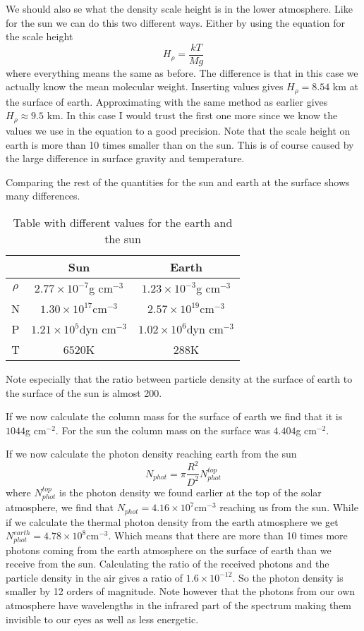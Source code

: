 \documentclass{aa}   %
\begin{document}
We should also se what the density scale height is in the lower atmosphere. Like for the sun we can do this two different ways. Either by using the equation for the scale height
\begin{equation}
 H_\rho = \frac{kT}{Mg}
\end{equation}
where everything means the same as before. The difference is that in this case we actually know the mean molecular weight. Inserting values gives $H_\rho = 8.54$ km at the surface of earth. Approximating with the same method as earlier gives $H_\rho \approx 9.5$ km. In this case I would trust the first one more since we know the values we use in the equation to a good precision. Note that the scale height on earth is more than 10 times smaller than on the sun. This is of course caused by the large difference in surface gravity and temperature.

Comparing the rest of the quantities for the sun and earth at the surface shows many differences.
\begin{table}
\begin{tabular}{|c|c|c|}
\hline
&Sun & Earth\\
\hline
$\rho$ &$2.77\times 10^{-7}$g cm$^{-3}$ &$1.23\times 10^{-3}$g cm$^{-3}$\\
\hline
N &$1.30\times10^{17}$cm$^{-3}$ &$2.57\times10^{19}$cm$^{-3}$ \\
\hline
P &$1.21\times10^{5}$dyn cm$^{-3}$ &$1.02\times10^{6}$dyn cm$^{-3}$ \\
\hline
T &$6520$K &$288$K\\
\hline
\end{tabular}
\caption{Table with different values for the earth and the sun}
\end{table}
Note especially that the ratio between particle density at the surface of earth to the surface of the sun is almost 200.

If we now calculate the column mass for the surface of earth we find that it is $1044$g cm$^{-2}$. For the sun the column mass on the surface was $4.404$g cm$^{-2}$.

If we now calculate the photon density reaching earth from the sun
\begin{equation}
 N_{phot} = \pi \frac{R^2}{D^2}N_{phot}^{top}
\end{equation}
where $N_{phot}^{top}$ is the photon density we found earlier at the top of the solar atmosphere, we find that $N_{phot} = 4.16\times10^{7}$cm$^{-3}$ reaching us from the sun.
While if we calculate the thermal photon density from the earth atmosphere we get $N_{phot}^{earth} = 4.78\times 10^8$cm$^{-3}$. Which means that there are more than 10 times more photons coming from the earth atmosphere on the surface of earth than we receive from the sun. Calculating the ratio of the received photons and the particle density in the air gives a ratio of $1.6\times 10^{-12}$. So the photon density is smaller by 12 orders of magnitude.
Note however that the photons from our own atmosphere have wavelengths in the infrared part of the spectrum making them invisible to our eyes as well as less energetic.
\end{document}
